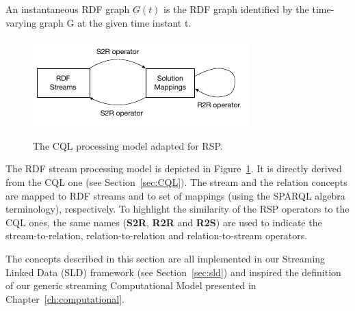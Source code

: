 \begin{Definition}
An instantaneous RDF graph $G(t)$ is the RDF graph identified by the time-varying graph G at the given time instant t.
\end{Definition}

\begin{figure}[t]
  \begin{center}
    \includegraphics[width=.65\textwidth]{img/cql-rdf-model}\\
    \caption{The CQL processing model adapted for RSP.}
    \label{fig:cql-rdf-model}
  \end{center}
\end{figure}

The RDF stream processing model is depicted in Figure~\ref{fig:cql-rdf-model}. It is directly derived from the CQL one (see Section~\ref{sec:CQL}). The stream and the relation concepts are mapped to RDF streams and to set of mappings (using the SPARQL algebra terminology), respectively. To highlight the similarity of the RSP operators \cite{DBLP:journals/ijswis/DellAglioVCC14} to the CQL ones, the same names (\textbf{S2R}, \textbf{R2R} and \textbf{R2S}) are used to indicate the stream-to-relation, relation-to-relation and relation-to-stream operators. 

The concepts described in this section are all implemented in our Streaming Linked Data (SLD) framework (see Section~\ref{sec:sld}) and inspired the definition of our generic streaming Computational Model presented in Chapter~\ref{ch:computational}. 

